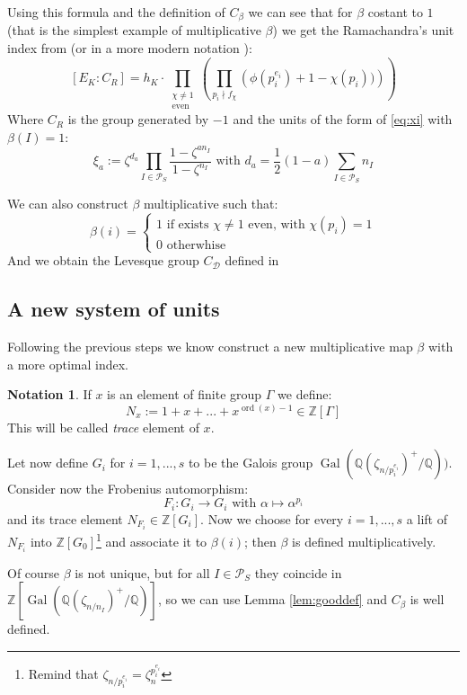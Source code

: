 \documentclass[]{article}
\theoremstyle{plain}
\theoremstyle{remark}
\theoremstyle{definition}
\newtheorem*{nota}{Notation}
\newcommand{\PS}{\mathcal{P}_S}
\newcommand{\Z}{\mathbb{Z}}
\newcommand{\Q}{\mathbb{Q}}
\DeclareMathOperator{\Gal}{Gal}
\DeclareMathOperator{\ord}{ord}
\begin{document}
	Using this formula and the definition of $ C_\beta $ we can see that for $\beta$ costant to $ 1 $ (that is the simplest example of multiplicative $\beta$) we get the Ramachandra's unit index from \cite{RAM} (or in a more modern notation \cite[Theorem~8.3]{CF} ):
	\begin{equation}\label{eq:idx_ram}
		[E_K : C_R ] = h_K \cdot  \prod_{ \substack{\chi \neq 1 \\ \text{even}}} \left( \prod_{p_i \nmid f_\chi} \left( \phi (p_i^{e_i})  + 1- \chi (p_i))\right)  \right) 
	\end{equation}
	Where $ C_R $ is the group generated by $ -1 $ and the units of the form of \ref{eq:xi} with $ \beta(I) = 1  $:
	\[ \xi_a := \zeta ^{d_a } \prod _{I \in \PS} \frac{ 1 - \zeta^{an_I}}{ 1 - \zeta^{n_I}}  \text{ with } d_a =\frac{1}{2}(1-a) \sum_{I \in \PS} n_I\]
	
	We can also construct $\beta$ multiplicative such that:
	\[ \beta(i) = \begin{cases} 1 \text{ if exists } \chi \neq 1 \text{ even, with } \chi(p_i)=1 \\ 0 \text{ otherwhise } \end{cases}\]
	And we obtain the Levesque group $ C_\mathcal{D} $ defined in \cite[Page~331]{LEV}
	
	\subsection{A new system of units}
	
	Following the previous steps we know construct a new multiplicative map $\beta$ with a more optimal index. 
	\begin{nota}
		If $ x $ is an element of finite group $\Gamma$ we define:
		\[ N_x := 1 + x + ... + x^{\ord (x) - 1} \in \Z[\Gamma]\]
		This will be called \textit{trace} element of $ x $.
	\end{nota}

	Let now define $ G_i $ for $ i=1,...,s $ to be the Galois group $ \Gal ( \Q(\zeta_{n/p_i^{e_i}})^+ / \Q)) $. Consider now the Frobenius automorphism:  
	\[ F_i : G_i \to G_i \text{ with }  \alpha \mapsto \alpha ^ {p_i}\]
	and its trace element $ N_{F_i} \in \Z [G_i]$. Now we choose for every $ i=1, ... , s $ a lift of $ N_{F_i} $ into $ \Z[G_0] $\footnote{Remind that $ \zeta_{n/p_i^{e_i}} = \zeta_n^{p_i^{e_i}}$} and associate it to $\beta(i)$; then $\beta$ is defined multiplicatively. 
	
	Of course $\beta$ is not unique, but for all $ I \in \PS $ they coincide in $ \Z[\Gal( \Q(\zeta_{n/n_I})^+ / \Q   )]  $, so we can use Lemma \ref{lem:gooddef} and $ C_\beta $ is well defined. 
	
\end{document}
